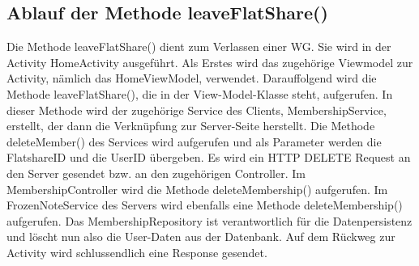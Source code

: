 \subsection{Ablauf der Methode leaveFlatShare()}

Die Methode leaveFlatShare() dient zum Verlassen einer WG. Sie wird in der Activity HomeActivity ausgeführt. Als Erstes wird das zugehörige Viewmodel zur Activity, nämlich das HomeViewModel, verwendet. Darauffolgend wird die Methode leaveFlatShare(), die in der View-Model-Klasse steht, aufgerufen. In dieser Methode wird der zugehörige Service des Clients, MembershipService, erstellt, der dann die Verknüpfung zur Server-Seite herstellt. Die Methode deleteMember() des Services wird aufgerufen und als Parameter werden die FlatshareID und die UserID übergeben. Es wird ein HTTP DELETE Request an den Server gesendet bzw. an den zugehörigen Controller. Im MembershipController wird die Methode deleteMembership() aufgerufen. Im FrozenNoteService des Servers wird ebenfalls eine Methode deleteMembership() aufgerufen. Das MembershipRepository ist verantwortlich für die Datenpersistenz und löscht nun also die User-Daten aus der Datenbank. Auf dem Rückweg zur Activity wird schlussendlich eine Response gesendet.